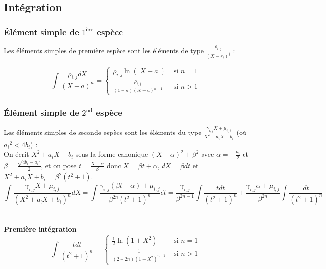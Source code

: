 \documentclass[a4paper,10pt]{book} %
\begin{document}
\subsection{Intégration}
\subsubsection{Élément simple de $1^{\text{ère}}$ espèce}
Les éléments simples de première espèce sont les éléments de type $\displaystyle\frac{\rho_{i,j}}{(X-r_i)^j}$ :

$$\displaystyle\int\frac{\rho_{i,j}dX}{(X-a)^n}=\left\{ \begin{array}{ccl}
\rho_{i,j}\ln(|X-a|) &\text{ si }n=1 & \\
\displaystyle\frac{\rho_{i,j}}{(1-n)(X-a)^{n-1}} &\text{ si }n>1 &
\end{array}\right.$$


\subsubsection{Élément simple de $2^{\text{nd}}$ espèce}
Les éléments simples de seconde espèce sont les éléments du type $\displaystyle\frac{\gamma_{i,j}X+\mu_{i,j}}{X^2+a_iX+b_i}$
(où $a_i{}^2<4b_i$) :\\

On écrit $X^2+a_iX+b_i$ sous la forme canonique $(X-\alpha)^2+\beta^2$ avec $\alpha=-\frac{a_i}{2}$ et $\beta=\frac{\sqrt{4b_i-a_i{}^2}}{2}$, et on pose $t=\frac{X-\alpha}{\beta}$ donc $X=\beta t+\alpha$, $dX=\beta dt$ et $X^2+a_iX+b_i=\beta^2(t^2+1)$.\\

$$\displaystyle\int\frac{\gamma_{i,j}X+\mu_{i,j}}{(X^2+a_iX+b_i)^n}dX=\int\frac{\gamma_{i,j}(\beta t+\alpha)+\mu_{i,j}}{\beta^{2n}(t^2+1)^n}dt=\frac{\gamma_{i,j}}{\beta^{2n-1}}\int\frac{tdt}{(t^2+1)^n}+ \frac{\gamma_{i,j}\alpha+\mu_{i,j}}{\beta^{2n}}\int\frac{dt}{(t^2+1)^n}$$\\\\

\textbf{Première intégration}\\
$$\displaystyle\int \frac{tdt}{(t^2+1)^n}=\left\{\begin{array}{ccl}\displaystyle\frac{1}{2}\ln(1+X^2)&\text{ si }n=1 &\\
\displaystyle\frac{1}{(2-2n)(1+X^2)^{n-1}}&\text{ si }n>1 &\end{array}\right.$$\\

\newpage
\end{document}
